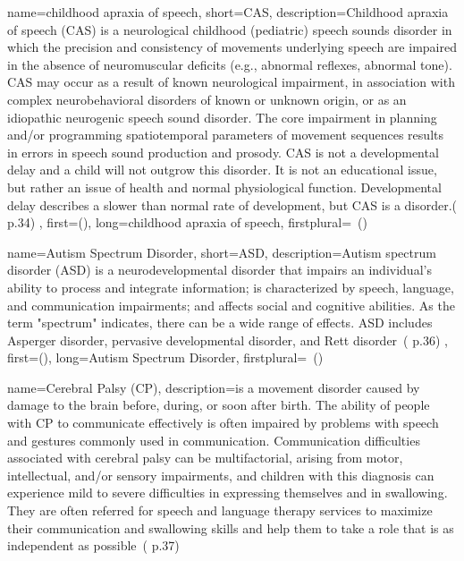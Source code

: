  {
	name={childhood apraxia of speech}, 
	short={CAS},
	description={Childhood apraxia of speech (CAS) is a neurological childhood (pediatric) speech sounds disorder in which the precision and consistency of movements underlying speech are impaired in the absence of neuromuscular deficits (e.g., abnormal reflexes, abnormal tone). CAS may occur as a result of known neurological impairment, in association with complex neurobehavioral disorders of known or unknown origin, or as an idiopathic neurogenic speech
sound disorder. The core impairment in planning and/or programming spatiotemporal parameters of movement sequences results in errors in speech sound production and prosody. CAS is not a developmental delay and a child will not outgrow this disorder. It is not an educational issue, but rather an issue of health and normal physiological function. Developmental delay describes a slower than normal rate of development, but CAS is a disorder.(\cite{SLPathologies} p.34)
},
first={}(),
	long={childhood apraxia of speech},
	firstplural={\glspluralsuffix\ (\glspluralsuffix )}
}

 {
	name={Autism Spectrum Disorder}, 
	short={ASD},
	description={Autism spectrum disorder (ASD) is a neurodevelopmental disorder that impairs an individual’s ability to process and integrate information; is characterized by speech, language, and communication impairments; and affects social and cognitive abilities. As the term "spectrum" indicates, there can be a wide range of effects. ASD includes Asperger disorder, pervasive developmental disorder, and Rett disorder~(\cite{SLPathologies} p.36)
},
first={}(),
	long={Autism Spectrum Disorder},
	firstplural={\glspluralsuffix\ (\glspluralsuffix )}
}

 {
	name={Cerebral Palsy (CP)}, 
	description={is a movement disorder caused by damage to the brain before, during, or soon after birth. The ability of people with CP to communicate effectively is often impaired by problems with speech and gestures commonly used in communication. Communication difficulties associated with cerebral palsy can be multifactorial, arising from motor, intellectual, and/or sensory impairments, and children with this diagnosis can experience mild to severe difficulties in expressing themselves and in swallowing. They are often referred for speech and language therapy services to maximize their communication and swallowing skills and help them to take a role that is as independent as possible~(\cite{SLPathologies} p.37)
}%
}

